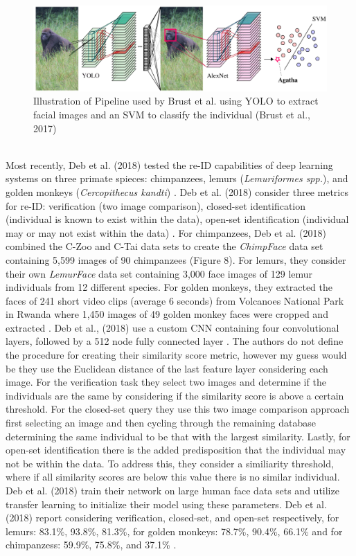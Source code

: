 \documentclass[11pt]{article}
\begin{document}
\begin{figure}
  \includegraphics[width=6.5in]{GorillaRe-ID.png}
  \caption{Illustration of Pipeline used by Brust et al. using YOLO to extract facial images and an SVM to classify the individual (Brust et al., 2017)}
\end{figure}

\noindent
\newline
\\
Most recently, Deb et al. (2018) tested the re-ID capabilities of deep learning systems on three primate spieces: chimpanzees, lemurs (\textit{Lemuriformes spp.}), and golden monkeys (\textit{Cercopithecus kandti}) \cite{deb2018face}. Deb et al. (2018) consider three metrics for re-ID: verification (two image comparison), closed-set identification (individual is known to exist within the data), open-set identification (individual may or may not exist within the data) \cite{deb2018face}. For chimpanzees, Deb et al. (2018) combined the C-Zoo and C-Tai data sets to create the  \textit{ChimpFace} data set containing 5,599 images of 90 chimpanzees (Figure 8). For lemurs, they consider their own \textit{LemurFace} data set containing 3,000 face images of 129 lemur individuals from 12 different species. For golden monkeys, they extracted the faces of 241 short video clips (average 6 seconds) from Volcanoes National Park in Rwanda where 1,450 images of 49 golden monkey faces were cropped and extracted \cite{deb2018face}. Deb et al., (2018) use a custom CNN containing four convolutional layers, followed by a 512 node fully connected layer \cite{deb2018face}. The authors do not define the procedure for creating their similarity score metric, however my guess would be they use the Euclidean distance of the last feature layer considering each image. For the verification task they select two images and determine if the individuals are the same by considering if the similarity score is above a certain threshold. For the closed-set query they use this two image comparison approach first selecting an image and then cycling through the remaining database determining the same individual to be that with the largest similarity. Lastly, for open-set identification there is the added predisposition that the individual may not be within the data. To address this, they consider a similiarity threshold, where if all similarity scores are below this value there is no similar individual. Deb et al. (2018) train their network on large human face data sets and utilize transfer learning to initialize their model using these parameters. Deb et al. (2018) report considering verification, closed-set, and open-set respectively, for lemurs: 83.1\%, 93.8\%, 81.3\%, for golden monkeys: 78.7\%, 90.4\%, 66.1\% and for chimpanzess: 59.9\%, 75.8\%, and 37.1\% \cite{deb2018face}. 
\end{document}
